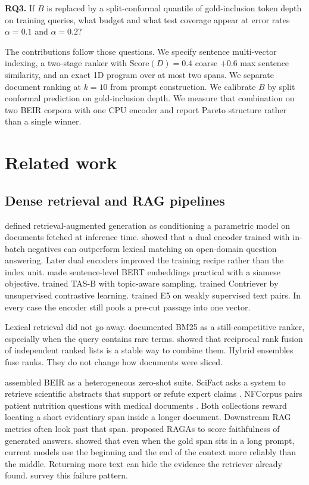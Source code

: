 \documentclass[preprint,12pt,authoryear]{elsarticle}
\begin{document}
\textbf{RQ3.} If \(B\) is replaced by a split-conformal quantile of gold-inclusion token depth on training queries, what budget and what test coverage appear at error rates \(\alpha=0.1\) and \(\alpha=0.2\)?

The contributions follow those questions. We specify sentence multi-vector indexing, a two-stage ranker with \(\mathrm{Score}(D)=0.4\) coarse \(+ 0.6\) max sentence similarity, and an exact 1D program over at most two spans. We separate document ranking at \(k=10\) from prompt construction. We calibrate \(B\) by split conformal prediction on gold-inclusion depth. We measure that combination on two BEIR corpora with one CPU encoder and report Pareto structure rather than a single winner.

\section{Related work}

\subsection{Dense retrieval and RAG pipelines}
\citet{lewis2020retrieval} defined retrieval-augmented generation as conditioning a parametric model on documents fetched at inference time. \citet{karpukhin2020dense} showed that a dual encoder trained with in-batch negatives can outperform lexical matching on open-domain question answering. Later dual encoders improved the training recipe rather than the index unit. \citet{reimers2019sentence} made sentence-level BERT embeddings practical with a siamese objective. \citet{hofstatter2021efficiently} trained TAS-B with topic-aware sampling. \citet{izacard2022unsupervised} trained Contriever by unsupervised contrastive learning. \citet{wang2022text} trained E5 on weakly supervised text pairs. In every case the encoder still pools a pre-cut passage into one vector.

Lexical retrieval did not go away. \citet{robertson2009probabilistic} documented BM25 as a still-competitive ranker, especially when the query contains rare terms. \citet{cormack2009reciprocal} showed that reciprocal rank fusion of independent ranked lists is a stable way to combine them. Hybrid ensembles fuse ranks. They do not change how documents were sliced.

\citet{thakur2021beir} assembled BEIR as a heterogeneous zero-shot suite. SciFact asks a system to retrieve scientific abstracts that support or refute expert claims \citep{wadden2020fact}. NFCorpus pairs patient nutrition questions with medical documents \citep{boteva2016full}. Both collections reward locating a short evidentiary span inside a longer document. Downstream RAG metrics often look past that span. \citet{es2024ragas} proposed RAGAs to score faithfulness of generated answers. \citet{liu2024lost} showed that even when the gold span sits in a long prompt, current models use the beginning and the end of the context more reliably than the middle. Returning more text can hide the evidence the retriever already found. \citet{gao2023retrieval} survey this failure pattern.
\end{document}
